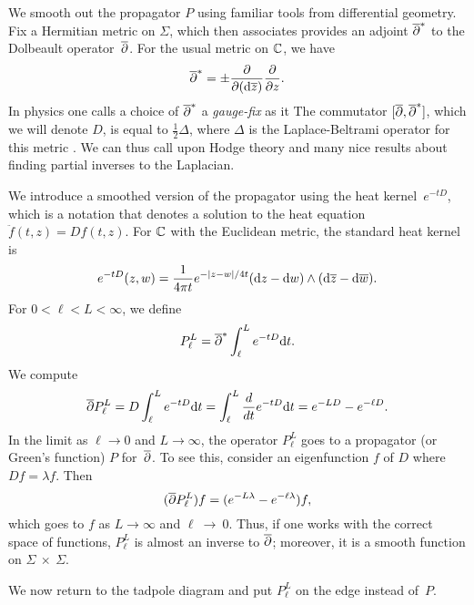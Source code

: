 We smooth out the propagator $P$ using familiar tools from differential geometry.
Fix a Hermitian metric on $\Sigma$, 
which then associates provides an adjoint $\overline{\partial}^*$ to the Dolbeault operator~$\overline{\partial}$.
For the usual metric on $\mathbb C$, we have
\[
\overline{\partial}^* = \pm \frac{\partial}{\partial ({\rm d} \overline{z})} \frac{\partial}{\partial z}.
\]
In physics one calls a choice of $\overline{\partial}^*$ a {\em gauge-fix} as it 
The commutator $[\overline{\partial},\overline{\partial}^*]$, which we will denote $D$, 
is equal to $\tfrac{1}{2} \Delta$, where $\Delta$ is the Laplace-Beltrami operator for this metric .
We can thus call upon Hodge theory and many nice results about finding partial inverses to the Laplacian.


We introduce a smoothed version of the propagator using the heat kernel~$e^{-tD}$,
which is a notation that denotes a solution to the heat equation $\ddot{f}(t,z) = Df(t,z)$.
For $\mathbb C$ with the Euclidean metric, the standard heat kernel is
\[
e^{-tD}(z,w) =  \frac{1}{4\pi t} e^{-|z-w|/4t} ({\rm d} z - {\rm d} w) \wedge ({\rm d}\overline{z} - {\rm d}\overline{w}). 
\]
For $0 < \ell < L < \infty$, we define
\[
P_\ell^L = \overline{\partial}^* \int_{\ell}^L e^{-tD}{\rm d} t.
\]
We compute
\[
\overline{\partial} P_\ell^L = D \int_{\ell}^L e^{-tD}{\rm d} t =  \int_{\ell}^L \frac{d}{dt} e^{-tD}{\rm d} t = e^{-LD} - e^{-\ell D}.
\]
In the limit as $\ell \to 0$ and $L \to \infty$, the operator $P_\ell^L$ goes to a propagator (or Green's function) $P$ for~$\overline{\partial}$.
To see this, consider an eigenfunction $f$ of $D$ where $Df=\lambda f$.
Then
\[
(\overline{\partial} P_\ell^L) f = (e^{-L\lambda} - e^{-\ell \lambda})f, 
\]
which goes to $f$ as $L \to \infty$ and $\ell~\to~0$.
Thus, if one works with the correct space of functions, 
$P_\ell^L$ is almost an inverse to $\overline{\partial}$;
moreover, it is a smooth function on $\Sigma~\times~\Sigma$.

We now return to the tadpole diagram and put $P_\ell^L$ on the edge instead of~$P$.

\subsubsection{}

